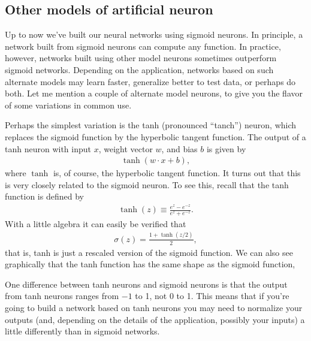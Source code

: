 \documentclass[a4paper,twoside,10pt]{book}
\begin{document}
\subsection*{Other models of artificial neuron}
Up to now we've built our neural networks using sigmoid neurons. In principle, a network built from sigmoid neurons can compute any function. In practice, however, networks built using other model neurons sometimes outperform sigmoid networks. Depending on the application, networks based on such alternate models may learn faster, generalize better to test data, or perhaps do both. Let me mention a couple of alternate model neurons, to give you the flavor of some variations in common use.

Perhaps the simplest variation is the tanh (pronounced ``tanch'') neuron, which replaces the sigmoid function by the hyperbolic tangent function. The output of a tanh neuron with input $x$, weight vector $w$, and bias $b$ is given by
\begin{eqnarray}
\tanh(w \cdot x+b), 
\label{eq:109}\end{eqnarray}
where $\tanh$ is, of course, the hyperbolic tangent function. It turns out that this is very closely related to the sigmoid neuron. To see this, recall that the tanh function is defined by
\begin{eqnarray}
\tanh(z) \equiv \frac{e^z-e^{-z}}{e^z+e^{-z}}.
\label{eq:110}
\end{eqnarray}
With a little algebra it can easily be verified that
\begin{eqnarray} 
\sigma(z) = \frac{1+\tanh(z/2)}{2},\label{eq:111}
\end{eqnarray}
that is, tanh is just a rescaled version of the sigmoid function. We can also see graphically that the tanh function has the same shape as the sigmoid function,
\begin{center} 
\end{center}
One difference between tanh neurons and sigmoid neurons is that the output from tanh neurons ranges from $-1$ to 1, not 0 to 1. This means that if you're going to build a network based on tanh neurons you may need to normalize your outputs (and, depending on the details of the application, possibly your inputs) a little differently than in sigmoid networks.
\end{document}
